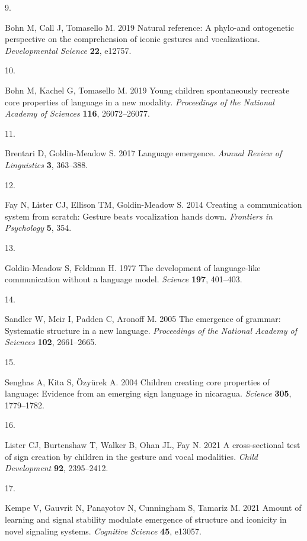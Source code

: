 \documentclass[
  man,floatsintext]{apa6}
\newlength{\cslhangindent}
\newlength{\csllabelwidth}
\newlength{\cslentryspacingunit} %
\newenvironment{CSLReferences}[2] %
 {%
  \setlength{\parindent}{0pt}
  \ifodd #1
  \let\oldpar\par
  \def\par{\hangindent=\cslhangindent\oldpar}
  \fi
  \setlength{\parskip}{#2\cslentryspacingunit}
 }%
 {}
\newcommand{\CSLLeftMargin}[1]{\parbox[t]{\csllabelwidth}{#1}}
\newcommand{\CSLRightInline}[1]{\parbox[t]{\linewidth - \csllabelwidth}{#1}\break}
\begin{document}
\begin{CSLReferences}{0}{0}
\leavevmode{}%
\CSLLeftMargin{9. }
\CSLRightInline{Bohn M, Call J, Tomasello M. 2019 Natural reference: A phylo-and ontogenetic perspective on the comprehension of iconic gestures and vocalizations. \emph{Developmental Science} \textbf{22}, e12757.}

\leavevmode{}%
\CSLLeftMargin{10. }
\CSLRightInline{Bohn M, Kachel G, Tomasello M. 2019 Young children spontaneously recreate core properties of language in a new modality. \emph{Proceedings of the National Academy of Sciences} \textbf{116}, 26072--26077.}

\leavevmode{}%
\CSLLeftMargin{11. }
\CSLRightInline{Brentari D, Goldin-Meadow S. 2017 Language emergence. \emph{Annual Review of Linguistics} \textbf{3}, 363--388.}

\leavevmode{}%
\CSLLeftMargin{12. }
\CSLRightInline{Fay N, Lister CJ, Ellison TM, Goldin-Meadow S. 2014 Creating a communication system from scratch: Gesture beats vocalization hands down. \emph{Frontiers in Psychology} \textbf{5}, 354.}

\leavevmode{}%
\CSLLeftMargin{13. }
\CSLRightInline{Goldin-Meadow S, Feldman H. 1977 The development of language-like communication without a language model. \emph{Science} \textbf{197}, 401--403.}

\leavevmode{}%
\CSLLeftMargin{14. }
\CSLRightInline{Sandler W, Meir I, Padden C, Aronoff M. 2005 The emergence of grammar: Systematic structure in a new language. \emph{Proceedings of the National Academy of Sciences} \textbf{102}, 2661--2665.}

\leavevmode{}%
\CSLLeftMargin{15. }
\CSLRightInline{Senghas A, Kita S, Özyürek A. 2004 Children creating core properties of language: Evidence from an emerging sign language in nicaragua. \emph{Science} \textbf{305}, 1779--1782.}

\leavevmode{}%
\CSLLeftMargin{16. }
\CSLRightInline{Lister CJ, Burtenshaw T, Walker B, Ohan JL, Fay N. 2021 A cross-sectional test of sign creation by children in the gesture and vocal modalities. \emph{Child Development} \textbf{92}, 2395--2412.}

\leavevmode{}%
\CSLLeftMargin{17. }
\CSLRightInline{Kempe V, Gauvrit N, Panayotov N, Cunningham S, Tamariz M. 2021 Amount of learning and signal stability modulate emergence of structure and iconicity in novel signaling systems. \emph{Cognitive Science} \textbf{45}, e13057.}


\end{CSLReferences}
\end{document}
